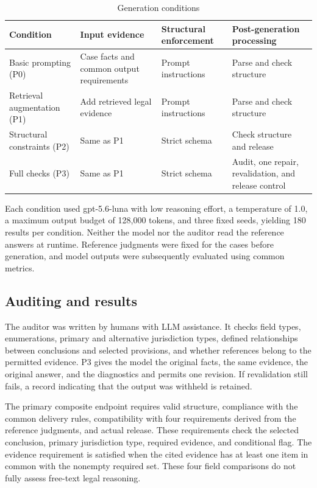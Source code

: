\documentclass[pdflatex,iicol,sn-mathphys-num]{sn-jnl}
\begin{document}
\begin{table}[!tbp]
\centering
\caption{Generation conditions}\label{tab:D1}
\small
\setlength{\tabcolsep}{4pt}
\renewcommand{\arraystretch}{1.20}
\begin{tabularx}{\textwidth}{@{}L L L L@{}}
\toprule
\textbf{Condition} & \textbf{Input evidence} & \textbf{Structural enforcement} & \textbf{Post-generation processing} \\
\midrule
Basic prompting (P0) & Case facts and common output requirements & Prompt instructions & Parse and check structure \\
Retrieval augmentation (P1) & Add retrieved legal evidence & Prompt instructions & Parse and check structure \\
Structural constraints (P2) & Same as P1 & Strict schema & Check structure and release \\
Full checks (P3) & Same as P1 & Strict schema & Audit, one repair, revalidation, and release control \\
\bottomrule
\end{tabularx}
\end{table}

Each condition used gpt-5.6-luna with low reasoning effort, a temperature of 1.0, a maximum output budget of 128,000 tokens, and three fixed seeds, yielding 180 results per condition. Neither the model nor the auditor read the reference answers at runtime. Reference judgments were fixed for the cases before generation, and model outputs were subsequently evaluated using common metrics.


\subsection{Auditing and results}\label{app:D-2}

The auditor was written by humans with LLM assistance. It checks field types, enumerations, primary and alternative jurisdiction types, defined relationships between conclusions and selected provisions, and whether references belong to the permitted evidence. P3 gives the model the original facts, the same evidence, the original answer, and the diagnostics and permits one revision. If revalidation still fails, a record indicating that the output was withheld is retained.


The primary composite endpoint requires valid structure, compliance with the common delivery rules, compatibility with four requirements derived from the reference judgments, and actual release. These requirements check the selected conclusion, primary jurisdiction type, required evidence, and conditional flag. The evidence requirement is satisfied when the cited evidence has at least one item in common with the nonempty required set. These four field comparisons do not fully assess free-text legal reasoning.
\end{document}
